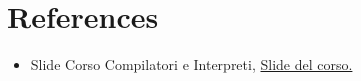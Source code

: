 \documentclass[../main]{subfiles}
\begin{document}
\section{References}

\begin{itemize}
    \item Slide Corso Compilatori e Interpreti,\label{ref:slides} \href{https://virtuale.unibo.it/course/view.php?id=17652}{Slide del corso.}

\end{itemize}
\end{document}
